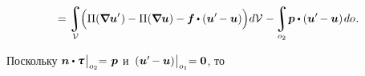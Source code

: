 \begin{otherlanguage}{russian}
\nopagebreak\vspace{-0.16em}\begin{equation*}
= \displaystyle
\integral\displaylimits_{\mathcal{V}} \hspace{-0.6ex}
\left(^{\mathstrut} \hspace{-0.1ex}
\Pi(\boldnabla \bm{u}'\hspace{.1ex}) - \Pi(\boldnabla \bm{u}) - \bm{f} \hspace{-0.1ex} \dotp ( \bm{u}' \hspace{-0.2ex} - \bm{u} ) \right) \hspace{-0.32ex} d\mathcal{V} \hspace{.1ex}
- \hspace{-0.2ex}
\integral\displaylimits_{o_2} \hspace{-0.32ex} \bm{p} \dotp ( \bm{u}' \hspace{-0.2ex} - \bm{u} ) \hspace{0.25ex} do \hspace{.1ex} .
\vspace{-0.25em}\end{equation*}

\vspace{-0.1em} \noindent Поскольку ${\bm{n} \dotp \mathboldtau \hspace{.16ex} \bigr|_{o_2} \hspace{-0.64ex} = \hspace{.2ex} \bm{p}}$ и~${( \bm{u}' \hspace{-0.2ex} - \bm{u} ) \hspace{.1ex} \bigr|_{o_1} \hspace{-0.64ex} = \bm{0}}$, то


\end{otherlanguage}
